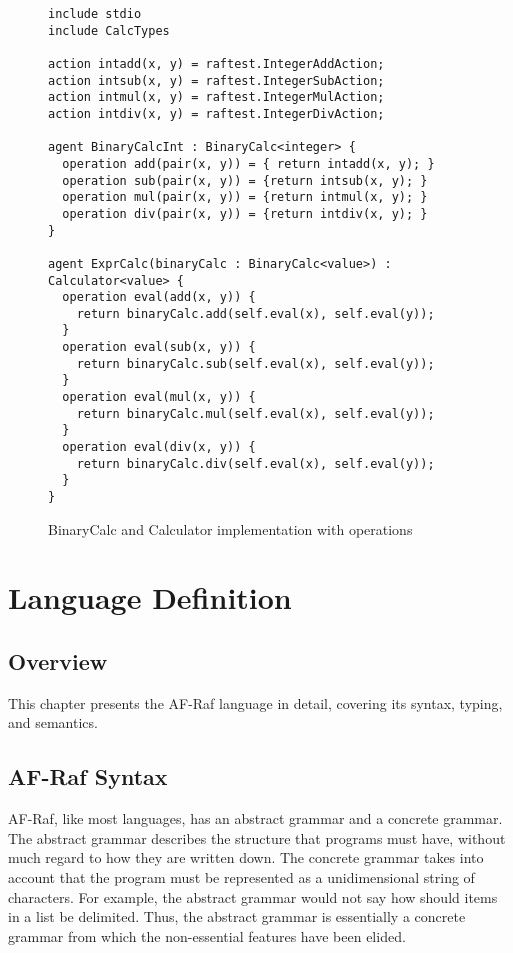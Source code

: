 \documentclass[a4paper,12pt,oneside,fleqn]{book} %
\begin{document}
\begin{figure}\footnotesize %
\begin{verbatim}
include stdio
include CalcTypes

action intadd(x, y) = raftest.IntegerAddAction;
action intsub(x, y) = raftest.IntegerSubAction;
action intmul(x, y) = raftest.IntegerMulAction;
action intdiv(x, y) = raftest.IntegerDivAction;

agent BinaryCalcInt : BinaryCalc<integer> {
  operation add(pair(x, y)) = { return intadd(x, y); }
  operation sub(pair(x, y)) = {return intsub(x, y); }
  operation mul(pair(x, y)) = {return intmul(x, y); }
  operation div(pair(x, y)) = {return intdiv(x, y); }
}

agent ExprCalc(binaryCalc : BinaryCalc<value>) : Calculator<value> {
  operation eval(add(x, y)) {
    return binaryCalc.add(self.eval(x), self.eval(y));
  }
  operation eval(sub(x, y)) {
    return binaryCalc.sub(self.eval(x), self.eval(y));
  }
  operation eval(mul(x, y)) {
    return binaryCalc.mul(self.eval(x), self.eval(y));
  }
  operation eval(div(x, y)) {
    return binaryCalc.div(self.eval(x), self.eval(y));
  }
}
\end{verbatim}
\caption{BinaryCalc and Calculator implementation with operations}
\label{fig:calc-op}
\end{figure} %




\chapter{Language Definition}\label{ch:langdef} %

\section{Overview}\label{sec:langdef.overview} %

This chapter presents the AF-Raf language in detail, covering its syntax,
typing, and semantics.

\section{AF-Raf Syntax} %

AF-Raf, like most languages, has an abstract grammar and a concrete
grammar. The abstract grammar describes the structure that programs must
have, without much regard to how they are written down. The concrete
grammar takes into account that the program must be represented as a
unidimensional string of characters. For example, the abstract grammar
would not say how should items in a list be delimited. Thus, the abstract
grammar is essentially a concrete grammar from which the non-essential
features have been elided.
\end{document}
